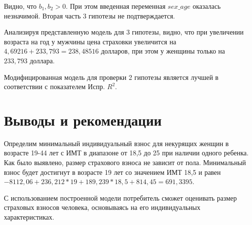 \documentclass[a4paper,12pt]{article}
\begin{document}
Видно, что $b_1, b_2 > 0$. При этом введенная переменная $sex\_age$ оказалась незначимой. Вторая часть 3 гипотезы не подтверждается.

Анализируя представленную модель для 3 гипотезы, видно, что при увеличении возраста на год у мужчины цена страховки увеличится на $4,69216 + 233,793 = 238,48516$ долларов, при этом у женщины только на $233,793$ доллара.

Модифицированная модель для проверки 2 гипотезы является лучшей в соответствии с показателем Испр. $R^2$.






\section{Выводы и рекомендации}
Определим минимальный индивидуальный взнос для некурящих женщин в возрасте 19-44 лет с ИМТ в диапазоне от 18,5 до 25 при наличии одного ребенка. Как было выявлено, размер страхового взноса не зависит от пола. Минимальный взнос будет достигнут в возрасте 19 лет со значением ИМТ 18,5 и равен $-8112,06 + 236,212 * 19 + 189,239 * 18,5 + 814,45 = 691,3395$.

С использованием построенной модели потребитель сможет оценивать размер страховых взносов человека, основываясь на его индивидуальных характеристиках. 
\end{document}
